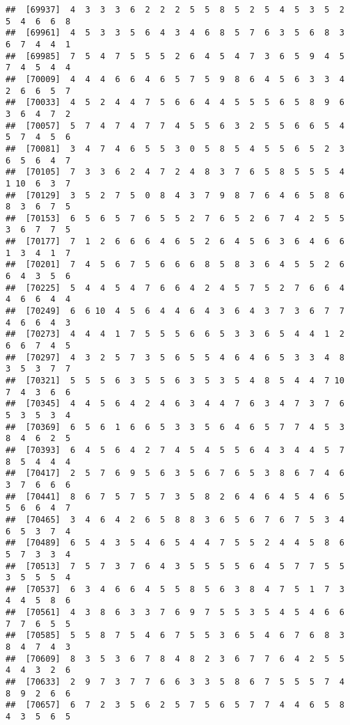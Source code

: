 \documentclass[
]{book}
\begin{document}
\begin{verbatim}
##  [69937]  4  3  3  3  6  2  2  2  5  5  8  5  2  5  4  5  3  5  2  5  4  6  6  8
##  [69961]  4  5  3  3  5  6  4  3  4  6  8  5  7  6  3  5  6  8  3  6  7  4  4  1
##  [69985]  7  5  4  7  5  5  5  2  6  4  5  4  7  3  6  5  9  4  5  7  4  5  4  4
##  [70009]  4  4  4  6  6  4  6  5  7  5  9  8  6  4  5  6  3  3  4  2  6  6  5  7
##  [70033]  4  5  2  4  4  7  5  6  6  4  4  5  5  5  6  5  8  9  6  3  6  4  7  2
##  [70057]  5  7  4  7  4  7  7  4  5  5  6  3  2  5  5  6  6  5  4  5  7  4  5  6
##  [70081]  3  4  7  4  6  5  5  3  0  5  8  5  4  5  5  6  5  2  3  6  5  6  4  7
##  [70105]  7  3  3  6  2  4  7  2  4  8  3  7  6  5  8  5  5  5  4  1 10  6  3  7
##  [70129]  3  5  2  7  5  0  8  4  3  7  9  8  7  6  4  6  5  8  6  8  3  6  7  5
##  [70153]  6  5  6  5  7  6  5  5  2  7  6  5  2  6  7  4  2  5  5  3  6  7  7  5
##  [70177]  7  1  2  6  6  6  4  6  5  2  6  4  5  6  3  6  4  6  6  1  3  4  1  7
##  [70201]  7  4  5  6  7  5  6  6  6  8  5  8  3  6  4  5  5  2  6  6  4  3  5  6
##  [70225]  5  4  4  5  4  7  6  6  4  2  4  5  7  5  2  7  6  6  4  4  6  6  4  4
##  [70249]  6  6 10  4  5  6  4  4  6  4  3  6  4  3  7  3  6  7  7  4  6  6  4  3
##  [70273]  4  4  4  1  7  5  5  5  6  6  5  3  3  6  5  4  4  1  2  6  6  7  4  5
##  [70297]  4  3  2  5  7  3  5  6  5  5  4  6  4  6  5  3  3  4  8  3  5  3  7  7
##  [70321]  5  5  5  6  3  5  5  6  3  5  3  5  4  8  5  4  4  7 10  7  4  3  6  6
##  [70345]  4  4  5  6  4  2  4  6  3  4  4  7  6  3  4  7  3  7  6  5  3  5  3  4
##  [70369]  6  5  6  1  6  6  5  3  3  5  6  4  6  5  7  7  4  5  3  8  4  6  2  5
##  [70393]  6  4  5  6  4  2  7  4  5  4  5  5  6  4  3  4  4  5  7  8  5  4  4  4
##  [70417]  2  5  7  6  9  5  6  3  5  6  7  6  5  3  8  6  7  4  6  3  7  6  6  6
##  [70441]  8  6  7  5  7  5  7  3  5  8  2  6  4  6  4  5  4  6  5  5  6  6  4  7
##  [70465]  3  4  6  4  2  6  5  8  8  3  6  5  6  7  6  7  5  3  4  6  5  3  7  4
##  [70489]  6  5  4  3  5  4  6  5  4  4  7  5  5  2  4  4  5  8  6  5  7  3  3  4
##  [70513]  7  5  7  3  7  6  4  3  5  5  5  5  6  4  5  7  7  5  5  3  5  5  5  4
##  [70537]  6  3  4  6  6  4  5  5  8  5  6  3  8  4  7  5  1  7  3  4  4  5  8  6
##  [70561]  4  3  8  6  3  3  7  6  9  7  5  5  3  5  4  5  4  6  6  7  7  6  5  5
##  [70585]  5  5  8  7  5  4  6  7  5  5  3  6  5  4  6  7  6  8  3  8  4  7  4  3
##  [70609]  8  3  5  3  6  7  8  4  8  2  3  6  7  7  6  4  2  5  5  4  4  3  2  6
##  [70633]  2  9  7  3  7  7  6  6  3  3  5  8  6  7  5  5  5  7  4  8  9  2  6  6
##  [70657]  6  7  2  3  5  6  2  5  7  5  6  5  7  7  4  4  6  5  8  4  3  5  6  5

\end{verbatim}
\end{document}
